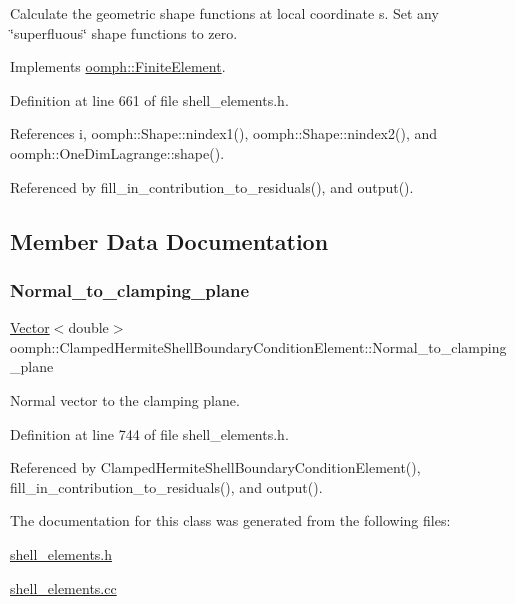 Calculate the geometric shape functions at local coordinate s. Set any \char`\"{}superfluous\char`\"{} shape functions to zero. 



Implements \hyperlink{classoomph_1_1FiniteElement_a58a25b6859ddd43b7bfe64a19fee5023}{oomph\+::\+Finite\+Element}.



Definition at line 661 of file shell\+\_\+elements.\+h.



References i, oomph\+::\+Shape\+::nindex1(), oomph\+::\+Shape\+::nindex2(), and oomph\+::\+One\+Dim\+Lagrange\+::shape().



Referenced by fill\+\_\+in\+\_\+contribution\+\_\+to\+\_\+residuals(), and output().



\subsection{Member Data Documentation}
\mbox{\label{classoomph_1_1ClampedHermiteShellBoundaryConditionElement_ae374c52cd948ff9871ea64442ef8a53d}} 
\subsubsection{\texorpdfstring{Normal\+\_\+to\+\_\+clamping\+\_\+plane}{Normal\_to\_clamping\_plane}}
{\footnotesize\ttfamily \hyperlink{classoomph_1_1Vector}{Vector}$<$double$>$ oomph\+::\+Clamped\+Hermite\+Shell\+Boundary\+Condition\+Element\+::\+Normal\+\_\+to\+\_\+clamping\+\_\+plane\hspace{0.3cm}{\ttfamily [private]}}



Normal vector to the clamping plane. 



Definition at line 744 of file shell\+\_\+elements.\+h.



Referenced by Clamped\+Hermite\+Shell\+Boundary\+Condition\+Element(), fill\+\_\+in\+\_\+contribution\+\_\+to\+\_\+residuals(), and output().



The documentation for this class was generated from the following files\+:\begin{DoxyCompactItemize}
\item 
\hyperlink{shell__elements_8h}{shell\+\_\+elements.\+h}\item 
\hyperlink{shell__elements_8cc}{shell\+\_\+elements.\+cc}\end{DoxyCompactItemize}
